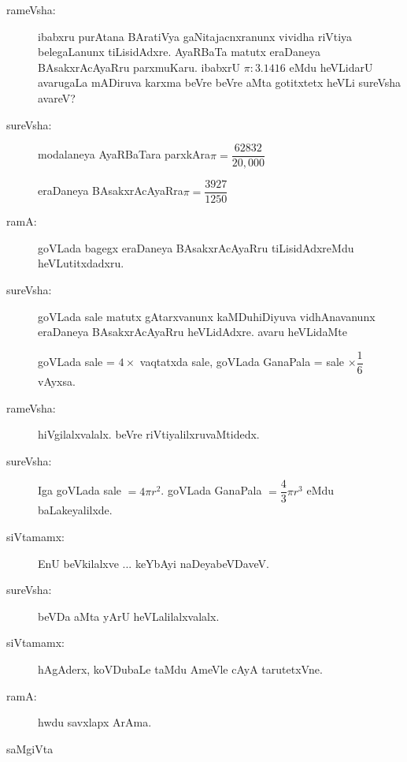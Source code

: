 \begin{description}
\item[rameVsha:] ibabxru purAtana BAratiVya gaNitajacnxranunx vividha riVtiya belegaLanunx tiLisidAdxre. AyaRBaTa matutx eraDaneya BAsakxrAcAyaRru parxmuKaru. ibabxrU $\pi:3.1416$ eMdu heVLidarU avarugaLa mADiruva karxma beVre beVre aMta gotitxtetx heVLi sureVsha avareV?

\item[sureVsha:] modalaneya AyaRBaTara parxkAra\quad $\pi=\dfrac{62832}{20,000}$

eraDaneya BAsakxrAcAyaRra\quad $\pi=\dfrac{3927}{1250}$

\item[ramA:] goVLada bagegx eraDaneya BAsakxrAcAyaRru tiLisidAdxreMdu heVLutitxdadxru.

\item[sureVsha:] goVLada sale matutx gAtarxvanunx kaMDuhiDiyuva vidhAnavanunx eraDaneya BAsakxrAcAyaRru heVLidAdxre. avaru heVLidaMte 

goVLada sale = $4\times{}$ vaqtatxda sale, goVLada GanaPala = sale $\times\dfrac{1}{6}$ vAyxsa.

\item[rameVsha:] hiVgilalxvalalx. beVre riVtiyalilxruvaMtidedx.

\item[sureVsha:] Iga goVLada sale $=4\pi r^{2}$. goVLada GanaPala $=\dfrac{4}{3}\pi r^{3}$ eMdu baLakeyalilxde.

\item[siVtamamx:] EnU beVkilalxve ... keYbAyi naDeyabeVDaveV.

\item[sureVsha:] beVDa aMta yArU heVLalilalxvalalx.

\item[siVtamamx:] hAgAderx, koVDubaLe taMdu AmeVle cAyA tarutetxVne.

\item[ramA:] hwdu savxlapx ArAma.
\end{description}
\centerline{saMgiVta}
